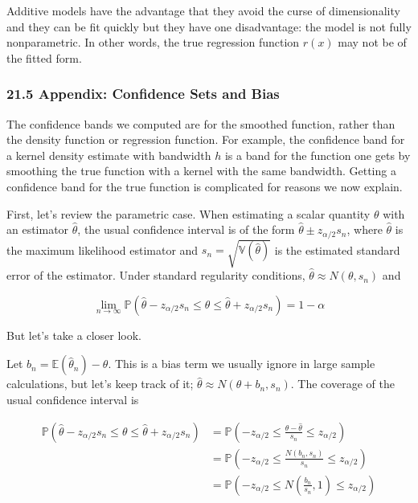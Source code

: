 Additive models have the advantage that they avoid the curse of
dimensionality and they can be fit quickly but they have one
disadvantage: the model is not fully nonparametric. In other words, the
true regression function \(r(x)\) may not be of the fitted form.

\subsubsection{21.5 Appendix: Confidence Sets and Bias}\label{appendix-confidence-sets-and-bias}

The confidence bands we computed are for the smoothed function, rather
than the density function or regression function. For example, the
confidence band for a kernel density estimate with bandwidth \(h\) is a
band for the function one gets by smoothing the true function with a
kernel with the same bandwidth. Getting a confidence band for the true
function is complicated for reasons we now explain.

First, let's review the parametric case. When estimating a scalar
quantity \(\theta\) with an estimator \(\hat{\theta}\), the usual
confidence interval is of the form
\(\hat{\theta} \pm z_{\alpha / 2} s_n\), where \(\hat{\theta}\) is the
maximum likelihood estimator and
\(s_n = \sqrt{\mathbb{V}(\hat{\theta})}\) is the estimated standard
error of the estimator. Under standard regularity conditions,
\(\hat{\theta} \approx N(\theta, s_n)\) and

\[ \lim_{n \rightarrow \infty} \mathbb{P} \left( \hat{\theta} - z_{\alpha / 2} s_n \leq \theta \leq \hat{\theta} + z_{\alpha / 2} s_n \right) = 1 - \alpha \]

But let's take a closer look.

Let \(b_n = \mathbb{E}(\hat{\theta}_n) - \theta\). This is a bias term
we usually ignore in large sample calculations, but let's keep track of
it; \(\hat{\theta} \approx N(\theta + b_n, s_n)\). The coverage of the
usual confidence interval is

\[
\begin{align}
\mathbb{P}\left(\hat{\theta} - z_{\alpha / 2} s_n \leq \theta \leq \hat{\theta} + z_{\alpha / 2} s_n \right)
&= \mathbb{P}\left(- z_{\alpha / 2}  \leq \frac{\theta - \hat{\theta}}{s_n} \leq z_{\alpha / 2}\right) \\
&= \mathbb{P}\left(- z_{\alpha / 2}  \leq \frac{N(b_n, s_n)}{s_n} \leq z_{\alpha / 2}\right) \\
&= \mathbb{P}\left(- z_{\alpha / 2}  \leq N\left(\frac{b_n}{s_n}, 1\right) \leq z_{\alpha / 2}\right)
\end{align}
\]

